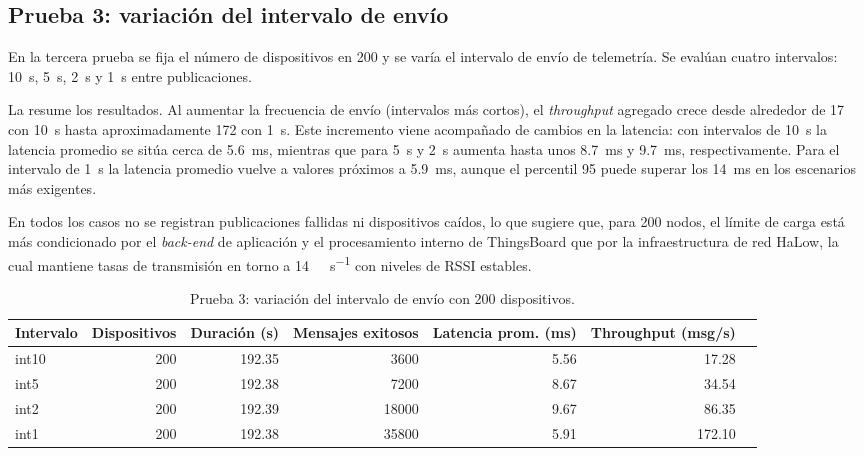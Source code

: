 \subsection{Prueba 3: variaci\'on del intervalo de env\'io}
En la tercera prueba se fija el n\'umero de dispositivos en \num{200} y se var\'ia el intervalo de env\'io de telemetr\'ia. Se eval\'uan cuatro intervalos: \SI{10}{\second}, \SI{5}{\second}, \SI{2}{\second} y \SI{1}{\second} entre publicaciones.

La  resume los resultados. Al aumentar la frecuencia de env\'io (intervalos m\'as cortos), el \emph{throughput} agregado crece desde alrededor de \SI{17}{} con \SI{10}{\second} hasta aproximadamente \SI{172}{} con \SI{1}{\second}. Este incremento viene acompa\~nado de cambios en la latencia: con intervalos de \SI{10}{\second} la latencia promedio se sit\'ua cerca de \SI{5.6}{\milli\second}, mientras que para \SI{5}{\second} y \SI{2}{\second} aumenta hasta unos \SI{8.7}{\milli\second} y \SI{9.7}{\milli\second}, respectivamente. Para el intervalo de \SI{1}{\second} la latencia promedio vuelve a valores pr\'oximos a \SI{5.9}{\milli\second}, aunque el percentil 95 puede superar los \SI{14}{\milli\second} en los escenarios m\'as exigentes.

En todos los casos no se registran publicaciones fallidas ni dispositivos ca\'idos, lo que sugiere que, para \num{200} nodos, el l\'imite de carga est\'a m\'as condicionado por el \emph{back-end} de aplicaci\'on y el procesamiento interno de ThingsBoard que por la infraestructura de red HaLow, la cual mantiene tasas de transmisi\'on en torno a \SI{14}{\mega\bit\per\second} con niveles de RSSI estables.

\begin{table}[!t]
\centering
\caption{Prueba 3: variaci\'on del intervalo de env\'io con 200 dispositivos.}
\label{tab:prueba3}
\begin{tabular}{@{}lrrrrrr@{}}
\toprule
Intervalo & Dispositivos & Duraci\'on (s) & Mensajes exitosos & Latencia prom. (ms) & Throughput (msg/s) \\
\midrule
int10 & 200 & 192.35 &  3600 &  5.56 &  17.28 \\
int5  & 200 & 192.38 &  7200 &  8.67 &  34.54 \\
int2  & 200 & 192.39 & 18000 &  9.67 &  86.35 \\
int1  & 200 & 192.38 & 35800 &  5.91 & 172.10 \\
\bottomrule
\end{tabular}
\end{table}

